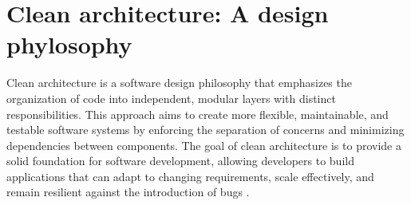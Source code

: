 \section{Clean architecture: A design phylosophy}\label{sec:ca_theory}

Clean architecture is a software design philosophy that emphasizes the organization of code
into independent, modular layers with distinct responsibilities. This approach aims to
create more flexible, maintainable, and testable software systems by enforcing the
separation of concerns and minimizing dependencies between components. The goal of clean
architecture is to provide a solid foundation for software development, allowing
developers to build applications that can adapt to changing requirements, scale
effectively, and remain resilient against the introduction of bugs
\parencite{robert_c_martin_clean_2018}.